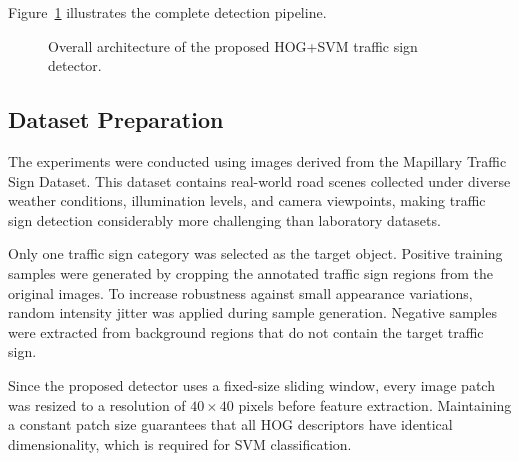 \documentclass[11pt,a4paper,twoside]{article}
\begin{document}
Figure~\ref{fig:pipeline} illustrates the complete detection pipeline.

\begin{figure}[ht]
\centering
{}
\caption{Overall architecture of the proposed HOG+SVM traffic sign detector.}
\label{fig:pipeline}
\end{figure}

\subsection{Dataset Preparation}

The experiments were conducted using images derived from the Mapillary Traffic Sign Dataset. This dataset contains real-world road scenes collected under diverse weather conditions, illumination levels, and camera viewpoints, making traffic sign detection considerably more challenging than laboratory datasets.

Only one traffic sign category was selected as the target object. Positive training samples were generated by cropping the annotated traffic sign regions from the original images. To increase robustness against small appearance variations, random intensity jitter was applied during sample generation. Negative samples were extracted from background regions that do not contain the target traffic sign.

Since the proposed detector uses a fixed-size sliding window, every image patch was resized to a resolution of $40\times40$ pixels before feature extraction. Maintaining a constant patch size guarantees that all HOG descriptors have identical dimensionality, which is required for SVM classification.
\end{document}
